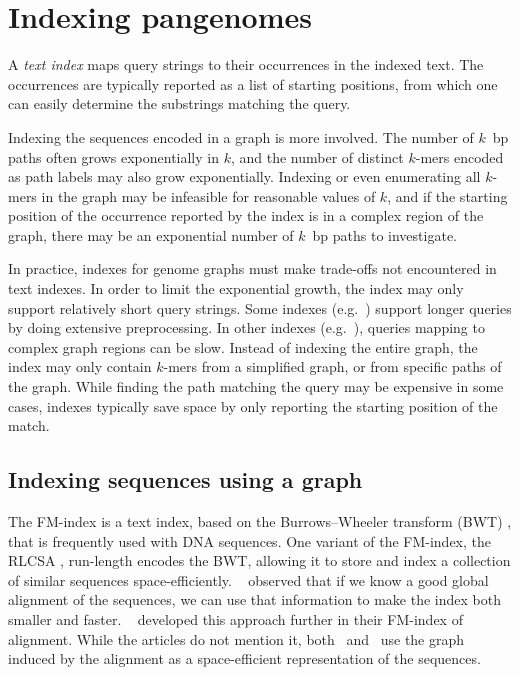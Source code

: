 \section{Indexing pangenomes} %
A \emph{text index} maps query strings to their occurrences in the indexed text.
The occurrences are typically reported as a list of starting positions, from which one can easily determine the substrings matching the query.

Indexing the sequences encoded in a graph is more involved.
The number of $k$~bp paths often grows exponentially in $k$, and the number of distinct $k$-mers encoded as path labels may also grow exponentially.
Indexing or even enumerating all $k$-mers in the graph may be infeasible for reasonable values of $k$, and if the starting position of the occurrence reported by the index is in a complex region of the graph, there may be an exponential number of $k$~bp paths to investigate.

In practice, indexes for genome graphs must make trade-offs not encountered in text indexes.
In order to limit the exponential growth, the index may only support relatively short query strings.
Some indexes (e.g.\ \cite{Siren_2014}) support longer queries by doing extensive preprocessing.
In other indexes (e.g.\ \cite{Thachuk_2013,Huang_2013,Maciuca_2016}), queries mapping to complex graph regions can be slow.
Instead of indexing the entire graph, the index may only contain $k$-mers from a simplified graph, or from specific paths of the graph.
While finding the path matching the query may be expensive in some cases, indexes typically save space by only reporting the starting position of the match.

\subsection{Indexing sequences using a graph}

The FM-index \cite{Ferragina_2005} is a text index, based on the Burrows--Wheeler transform (BWT) \cite{Burrows_1994}, that is frequently used with DNA sequences.
One variant of the FM-index, the RLCSA \cite{Maekinen_2010}, run-length encodes the BWT, allowing it to store and index a collection of similar sequences space-efficiently.
\citeauthor{Huang_2010}\ \cite{Huang_2010} observed that if we know a good global alignment of the sequences, we can use that information to make the index both smaller and faster.
\citeauthor{Na_2016}\ \cite{Na_2016,Na_2018} developed this approach further in their FM-index of alignment.
While the articles do not mention it, both \citeauthor{Huang_2010}\ and \citeauthor{Na_2016}\ use the graph induced by the alignment as a space-efficient representation of the sequences.

